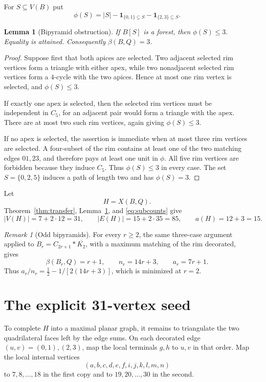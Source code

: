 \documentclass[11pt]{article}
\newtheorem{lemma}[theorem]{Lemma}
\theoremstyle{definition}
\theoremstyle{remark}
\newtheorem{remark}[theorem]{Remark}
\newcommand{\ind}{\mathbf 1}
\begin{document}
For $S\subseteq V(B)$ put
\[
 \phi(S)=|S|
 -\ind_{\{0,1\}\subseteq S}
 -\ind_{\{2,3\}\subseteq S}.
\]

\begin{lemma}[Bipyramid obstruction]\label{lem:bipyramid}
If $B[S]$ is a forest, then $\phi(S)\le3$.  Equality is attained.
Consequently $\beta(B,Q)=3$.
\end{lemma}

\begin{proof}
Suppose first that both apices are selected.  Two adjacent selected rim
vertices form a triangle with either apex, while two nonadjacent selected rim
vertices form a $4$-cycle with the two apices.  Hence at most one rim vertex
is selected, and $\phi(S)\le3$.

If exactly one apex is selected, then the selected rim vertices must be
independent in $C_5$, for an adjacent pair would form a triangle with the
apex.  There are at most two such rim vertices, again giving
$\phi(S)\le3$.

If no apex is selected, the assertion is immediate when at most three rim
vertices are selected.  A four-subset of the rim contains at least one of
the two matching edges $01,23$, and therefore pays at least one unit in
$\phi$.  All five rim vertices are forbidden because they induce $C_5$.
Thus $\phi(S)\le3$ in every case.  The set $S=\{0,2,5\}$ induces a path of
length two and has $\phi(S)=3$.
\end{proof}

Let
\[
 H=X(B,Q).
\]
Theorem~\ref{thm:transfer}, Lemma~\ref{lem:bipyramid}, and
\eqref{eq:subcounts} give
\begin{equation}\label{eq:H}
 |V(H)|=7+2\cdot12=31,
 \qquad
 |E(H)|=15+2\cdot35=85,
 \qquad
 a(H)=12+3=15.
\end{equation}

\begin{remark}[Odd bipyramids]\label{rem:odd}
For every $r \ge 2$, the same three-case argument applied to
$B_r=C_{2r+1}*\overline{K_2}$, with a maximum matching of the rim decorated,
gives
\[
 \beta(B_r,Q)=r+1,\qquad
 n_r=14r+3,\qquad
 a_r=7r+1.
\]
Thus $a_r/n_r=\frac12-1/[2(14r+3)]$, which is minimized at $r=2$.
\end{remark}

\section{The explicit 31-vertex seed}

To complete $H$ into a maximal planar graph, it remains to triangulate
the two quadrilateral faces left by the edge sums.  On each decorated
edge $(u,v)=(0,1),(2,3)$, map the local terminals $g,h$ to $u,v$ in that
order.  Map the local internal vertices
\[
 (a,b,c,d,e,f,i,j,k,l,m,n)
\]
to $7,8,\ldots,18$ in the first copy and to $19,20,\ldots,30$ in the
second.
\end{document}
